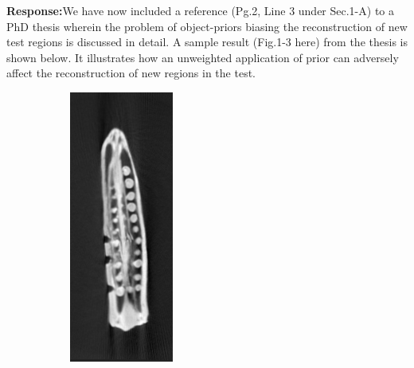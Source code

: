 \documentclass{article}
\begin{document}
\textbf{Response:}We have now included a reference (Pg.2, Line 3 under Sec.1-A) to a PhD thesis wherein the problem of object-priors biasing the reconstruction of new test regions is discussed in detail. 
A sample result (Fig.1-3 here) from the thesis is shown below. It illustrates how an unweighted application of prior can adversely affect the reconstruction of new regions in the test.\\

\begin{figure}[!h]
    \begin{subfigure}[b]{0.19\linewidth}
        \includegraphics[width=\textwidth]{../images/thesis/okra/templateCropped_1.png}

\end{subfigure}
\end{figure}
\end{document}

